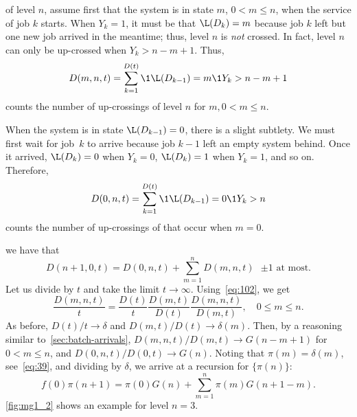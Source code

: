  of level $n$, assume first that the system is in state $m$, $0<m \leq n$, when the service of job $k$ starts.
When $Y_k=1$, it must be that $\L(D_k)=m$ because job $k$ left but one new job arrived in the meantime; thus, level $n$ is \emph{not} crossed.
In fact, level $n$ can only be up-crossed when $Y_k > n-m + 1$. Thus,
\begin{equation*}
D(m, n, t)  = \sum_{k=1}^{D(t)}\1{\L(D_{k-1})=m}\1{Y_k > n-m+1}
\end{equation*}
counts the number of up-crossings of level $n$ for $m, 0< m \leq n$.

When the system is in state $\L(D_{k-1}) = 0$, there is a slight subtlety.
We must first wait for job~$k$ to arrive
because job $k-1$ left an empty system behind.
Once it arrived, $\L(D_k)=0$ when $Y_k=0$, $\L(D_k) = 1$ when $Y_k=1$, and so on.
Therefore,
\begin{equation*}
D(0, n, t)  = \sum_{k=1}^{D(t)}\1{\L(D_{k-1})=0}\1{Y_k > n}
\end{equation*}
counts the number of up-crossings of that occur when $m=0$.



 we have that
\begin{equation*}
D(n+1,0, t) =  D(0, n, t) + \sum_{m=1}^n D(m,n, t) \text{ $\pm 1$  at most.}
\end{equation*}
Let us divide by $t$ and take the limit $t\to\infty$.  Using~\cref{eq:102}, we get
\begin{equation*}
  \frac{D(m,n,t)}{t} =
 \frac{D(t)}{t}
\frac{D(m,t)}{D(t)}
  \frac{D(m,n,t)}{D(m,t)}, \quad 0\leq m \leq n.
\end{equation*}
As before, $D(t)/t\to \delta$ and $D(m,t)/D(t)\to \delta(m)$.
Then, by a reasoning similar to~\cref{sec:batch-arrivals}, $D(m,n,t)/D(m,t) \to G(n-m+1)$ for $0<m\leq n$, and $D(0,n,t)/D(0,t) \to G(n)$.
Noting that $\pi(m) = \delta(m)$, see~\cref{eq:39}, and dividing by $\delta$,  we arrive at  a recursion for $\{\pi(n)\}$:
\begin{equation}\label{eq:72}
 f(0) \pi(n+1) = \pi(0) G(n) + \sum_{m=1}^{n} \pi(m) G(n+1-m).
\end{equation}
\cref{fig:mg1_2} shows an example for level $n=3$.

